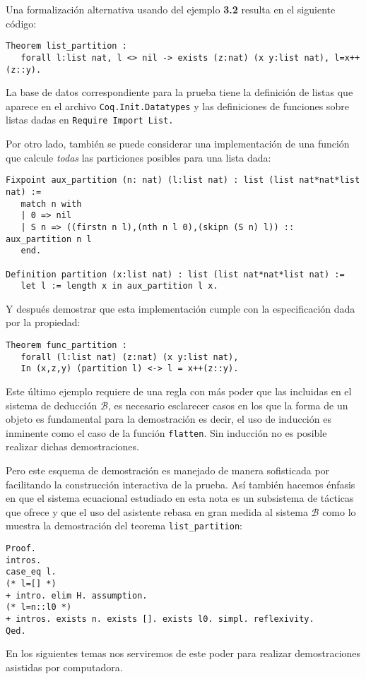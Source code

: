 \documentclass[11pt,letterpaper]{article}
\begin{document}
\beje
Una formalizaci\'on alternativa usando {\coq} del ejemplo \textbf{3.2} resulta 
en el siguiente c\'odigo:
\begin{lstlisting}
Theorem list_partition : 
   forall l:list nat, l <> nil -> exists (z:nat) (x y:list nat), l=x++(z::y).
\end{lstlisting}

La base de datos correspondiente para la prueba tiene la definici\'on de 
listas que aparece en el archivo \verb=Coq.Init.Datatypes= y las 
definiciones de funciones sobre listas dadas en \verb=Require Import List.=

Por otro lado, tambi\'en se puede considerar una implementaci\'on de una 
funci\'on que calcule \textit{todas} las particiones posibles para una lista 
dada:
\begin{lstlisting}
Fixpoint aux_partition (n: nat) (l:list nat) : list (list nat*nat*list nat) :=
   match n with 
   | 0 => nil
   | S n => ((firstn n l),(nth n l 0),(skipn (S n) l)) :: aux_partition n l
   end.

Definition partition (x:list nat) : list (list nat*nat*list nat) :=
   let l := length x in aux_partition l x.
\end{lstlisting}
Y despu\'es demostrar que esta implementaci\'on cumple con la 
especificaci\'on dada por la propiedad:
\begin{lstlisting}
Theorem func_partition : 
   forall (l:list nat) (z:nat) (x y:list nat), 
   In (x,z,y) (partition l) <-> l = x++(z::y).
\end{lstlisting}

Este \'ultimo ejemplo requiere de una regla con m\'as poder que las incluidas 
en el sistema de deducci\'on $\mathcal{B}$, es necesario esclarecer casos en 
los que la forma de un objeto es fundamental para la demostraci\'on es decir, 
el uso de inducci\'on es inminente como el caso de la funci\'on \verb-flatten-. 
Sin inducci\'on no es posible realizar dichas demostraciones.

Pero este esquema de demostraci\'on es manejado de manera sofisticada por 
{\coq} facilitando la construcci\'on interactiva de la prueba.
As\'i tambi\'en hacemos \'enfasis en que el sistema ecuacional estudiado en 
esta nota es un subsistema de t\'acticas que ofrece {\coq} y que el uso 
del asistente rebasa en gran medida al sistema $\mathcal{B}$ como lo muestra la 
demostraci\'on del teorema \verb=list_partition=:
\begin{lstlisting}
Proof.
intros.
case_eq l.
(* l=[] *)
+ intro. elim H. assumption.
(* l=n::l0 *)
+ intros. exists n. exists []. exists l0. simpl. reflexivity.
Qed.
\end{lstlisting}
\eeje
En los siguientes temas nos serviremos de este poder para realizar 
demostraciones asistidas por computadora. 
\end{document}
